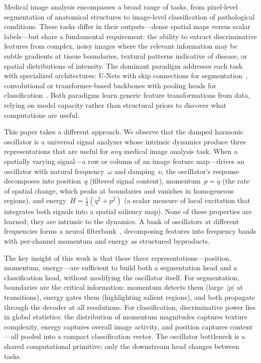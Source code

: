\documentclass[11pt]{article}
\begin{document}
Medical image analysis encompasses a broad range of tasks, from pixel-level segmentation of anatomical structures to image-level classification of pathological conditions. These tasks differ in their outputs---dense spatial maps versus scalar labels---but share a fundamental requirement: the ability to extract discriminative features from complex, noisy images where the relevant information may be subtle gradients at tissue boundaries, textural patterns indicative of disease, or spatial distributions of intensity. The dominant paradigm addresses each task with specialized architectures: U-Nets with skip connections for segmentation~\cite{ronneberger2015unet}, convolutional or transformer-based backbones with pooling heads for classification~\cite{he2016resnet,dosovitskiy2021vit}. Both paradigms learn generic feature transformations from data, relying on model capacity rather than structural priors to discover what computations are useful.

This paper takes a different approach. We observe that the damped harmonic oscillator is a universal signal analyzer whose intrinsic dynamics produce three representations that are useful for \emph{any} medical image analysis task. When a spatially varying signal---a row or column of an image feature map---drives an oscillator with natural frequency~$\omega$ and damping~$\nu$, the oscillator's response decomposes into position~$q$ (filtered signal content), momentum~$p = \dot{q}$ (the rate of spatial change, which peaks at boundaries and vanishes in homogeneous regions), and energy~$H = \tfrac{1}{2}(q^2 + p^2)$ (a scalar measure of local excitation that integrates both signals into a spatial saliency map). None of these properties are learned; they are intrinsic to the dynamics. A bank of oscillators at different frequencies forms a neural filterbank~\cite{lyon2017human}, decomposing features into frequency bands with per-channel momentum and energy as structured byproducts.

The key insight of this work is that these three representations---position, momentum, energy---are sufficient to build both a segmentation head and a classification head, without modifying the oscillator itself. For segmentation, boundaries are the critical information: momentum detects them (large~$|p|$ at transitions), energy gates them (highlighting salient regions), and both propagate through the decoder at all resolutions. For classification, discriminative power lies in global statistics: the distribution of momentum magnitudes captures texture complexity, energy captures overall image activity, and position captures content---all pooled into a compact classification vector. The oscillator bottleneck is a shared computational primitive; only the downstream head changes between tasks.
\end{document}
